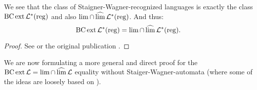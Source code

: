 \begin{theorem}
\label{thm:staiger-wagner}
We see that the class of Staigner-Wagner-recognized languages is exactly the class $\operatorname{BC} \operatorname{ext} \mathcal{L}^*(\textup{\textrm{reg}})$ and also $\lim \cap \operatorname{\widehat{lim}} \mathcal{L}^*(\textup{\textrm{reg}})$. And thus:
\[ \operatorname{BC} \operatorname{ext} \mathcal{L}^*(\textup{\textrm{reg}}) = \lim \cap \operatorname{\widehat{lim}} \mathcal{L}^*(\textup{\textrm{reg}}) . \]
\begin{proof}
See \cite[Theorem 63+64, p.44]{InfCompR101} or the original publication \cite{StaigerW74}.
\end{proof}
\end{theorem}

We are now formulating a more general and direct proof for the $\operatorname{BC} \operatorname{ext} \mathcal{L} = \lim \cap \operatorname{\widehat{lim}} \mathcal{L}$ equality without Staiger-Wagner-automata (where some of the ideas are loosely based on \cite[Theorem 63+64, p.44]{InfCompR101}).

